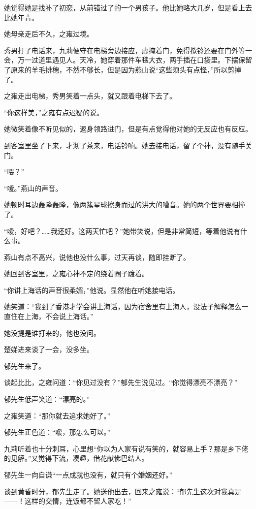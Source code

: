 \par 她觉得她是找补了初恋，从前错过了的一个男孩子。他比她略大几岁，但是看上去比她年青。
\par 她母亲走后不久，之雍过境。
\par 秀男打了电话来，九莉便守在电梯旁边接应，虚掩着门，免得揿铃还要在门外等一会，万一过道里遇见人。天冷，她穿着那件车毯大衣，两手插在口袋里。下摆保留了原来的羊毛排穗，不然不够长，但是因为燕山说“这些须头有点怪，”所以剪掉了。
\par 之雍走出电梯，秀男笑着一点头，就又跟着电梯下去了。
\par “你这样美，”之雍有点迟疑的说。
\par 她微笑着像不听见似的，返身领路进门，但是有点觉得他对她的无反应也有反应。
\par 到客室里坐了下来，才沏了茶来，电话铃响。她去接电话，留了个神，没有随手关门。
\par “喂？”
\par “嗳。”燕山的声音。
\par 她顿时耳边轰隆轰隆，像两簇星球擦身而过的洪大的嘈音。她的两个世界要相撞了。
\par “嗳，好吧？……我还好。这两天忙吧？”她带笑说，但是非常简短，等着他说有什么事。
\par 燕山有点不高兴，说他也没什么事，过天再谈，随即挂断了。
\par 她回到客室里，之雍心神不定的绕着圈子踱着。
\par “你讲上海话的声音很柔媚，”他说。显然他在听她接电话。
\par 她笑道：“我到了香港才学会讲上海话，因为宿舍里有上海人，没法子解释怎么一直住在上海，不会说上海话。”
\par 她没提是谁打来的，他也没问。
\par 楚娣进来谈了一会，没多坐。
\par 郁先生来了。
\par 谈起比比，之雍问道：“你见过没有？”郁先生说见过。“你觉得漂亮不漂亮？”
\par 郁先生低声笑道：“漂亮的。”
\par 之雍笑道：“那你就去追求她好了。”
\par 郁先生正色道：“嗳，那怎么可以。”
\par 九莉听着也十分刺耳，心里想“你以为人家有说有笑的，就容易上手？那是乡下佬的见解。”又觉得下流，凑趣，借花献佛巴结人。
\par 郁先生一向自谦“一点成就也没有，就只有个婚姻还好。”
\par 谈到黄昏时分，郁先生走了。她送他出去，回来之雍说：“郁先生这次对我真是——！这样的交情，连饭都不留人家吃！”
